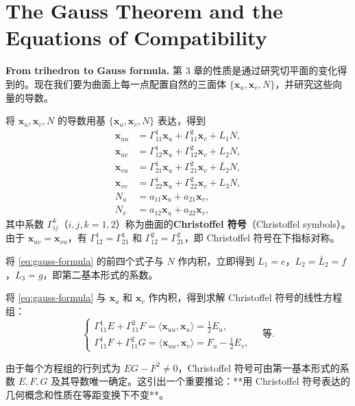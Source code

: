 \section{The Gauss Theorem and the Equations of Compatibility}\label{sec:gauss-theorem}

\textbf{From trihedron to Gauss formula.} 第 3 章的性质是通过研究切平面的变化得到的。现在我们要为曲面上每一点配置自然的三面体 $\{\mathbf{x}_u, \mathbf{x}_v, N\}$，并研究这些向量的导数。

将 $\mathbf{x}_u, \mathbf{x}_v, N$ 的导数用基 $\{\mathbf{x}_u, \mathbf{x}_v, N\}$ 表达，得到
\[
\begin{aligned}
\mathbf{x}_{uu} &= \Gamma_{11}^1 \mathbf{x}_u + \Gamma_{11}^2 \mathbf{x}_v + L_1 N,\\
\mathbf{x}_{uv} &= \Gamma_{12}^1 \mathbf{x}_u + \Gamma_{12}^2 \mathbf{x}_v + L_2 N,\\
\mathbf{x}_{vu} &= \Gamma_{21}^1 \mathbf{x}_u + \Gamma_{21}^2 \mathbf{x}_v + \bar{L}_2 N,\\
\mathbf{x}_{vv} &= \Gamma_{22}^1 \mathbf{x}_u + \Gamma_{22}^2 \mathbf{x}_v + L_3 N,\\
N_u &= a_{11}\mathbf{x}_u + a_{21}\mathbf{x}_v,\\
N_v &= a_{12}\mathbf{x}_u + a_{22}\mathbf{x}_v,
\end{aligned}
\label{eq:gauss-formula}
\]
其中系数 $\Gamma_{ij}^k$（$i,j,k=1,2$）称为曲面的\textbf{Christoffel 符号}（Christoffel symbols）。由于 $\mathbf{x}_{uv} = \mathbf{x}_{vu}$，有 $\Gamma_{12}^1 = \Gamma_{21}^1$ 和 $\Gamma_{12}^2 = \Gamma_{21}^2$，即 Christoffel 符号在下指标对称。

将 \cref{eq:gauss-formula} 的前四个式子与 $N$ 作内积，立即得到 $L_1 = e$，$L_2 = \bar{L}_2 = f$，$L_3 = g$，即第二基本形式的系数。

将 \cref{eq:gauss-formula} 与 $\mathbf{x}_u$ 和 $\mathbf{x}_v$ 作内积，得到求解 Christoffel 符号的线性方程组：
\[
\begin{cases}
\Gamma_{11}^1 E + \Gamma_{11}^2 F = \langle \mathbf{x}_{uu}, \mathbf{x}_u \rangle = \frac{1}{2}E_u,\\
\Gamma_{11}^1 F + \Gamma_{11}^2 G = \langle \mathbf{x}_{uu}, \mathbf{x}_v \rangle = F_u - \frac{1}{2}E_v,
\end{cases}
\quad \text{等.}
\label{eq:christoffel-system}
\]

由于每个方程组的行列式为 $EG-F^2 \neq 0$，Christoffel 符号可由第一基本形式的系数 $E,F,G$ 及其导数唯一确定。这引出一个重要推论：**用 Christoffel 符号表达的几何概念和性质在等距变换下不变**。

